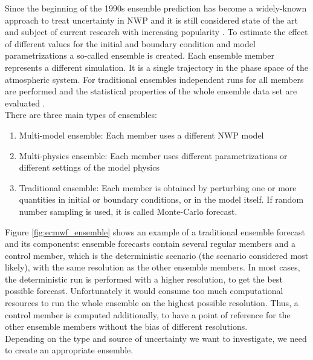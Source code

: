 Since the beginning of the 1990s  ensemble prediction has become a widely-known approach to treat uncertainty in NWP and it is still considered state of the art and subject of current research with increasing popularity \cite{wilks2011statistical, bauer2015quiet, leutbecher2008ensemble, Shemyakin2018,palmer1993ensemble}. 
To estimate the effect of different values for the initial and boundary condition and model parametrizations  a so-called ensemble is created.
Each ensemble member represents a different simulation. It is a single trajectory in the phase space of the atmospheric system. For traditional ensembles independent runs for all members are performed and the statistical properties of the whole ensemble data set are evaluated \cite{leutbecher2008ensemble}.\\
There are three main types of ensembles:
\begin{enumerate}
\item {Multi-model ensemble: Each member uses a different NWP model  \cite{ebert}}
\item{Multi-physics ensemble: Each member uses different parametrizations or different settings of the model physics \cite{Houtekamer}}
\item{Traditional ensemble: Each member is obtained by perturbing one or more quantities in initial or boundary conditions, or in the model itself. If random number sampling is used, it is called Monte-Carlo forecast.}
\cite{du2007uncertainty, wilks2011statistical, leith1974theoretical}
\end{enumerate}
Figure \ref{fig:ecmwf_ensemble} shows an example of a traditional ensemble forecast and its components: ensemble forecasts contain several regular members and a control member, which is the deterministic scenario (the scenario considered most likely), with the same resolution as the other ensemble members. In most cases, the deterministic run is performed with a higher resolution, to get the best possible forecast. Unfortunately it would consume too much computational resources to run the whole ensemble on the highest possible resolution. Thus, a control member is computed additionally, to have a point of reference for the other ensemble members without the bias of different resolutions.\\
Depending on the type and source of uncertainty we want to investigate, we need to create an appropriate ensemble.\\
